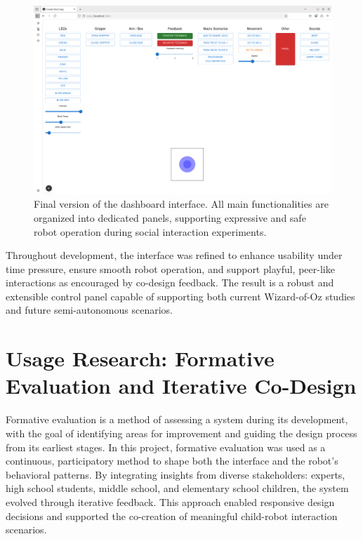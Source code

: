 \documentclass[a4paper]{usiinfbachelorproject}
\begin{document}
\begin{figure}[H]
    \centering
    \includegraphics[width=\linewidth]{figures/dashboard_v3.png}
    \caption{Final version of the dashboard interface. All main functionalities are organized into dedicated panels, supporting expressive and safe robot operation during social interaction experiments.}
    \label{fig:dashboard-v3-desc}
\end{figure}

Throughout development, the interface was refined to enhance usability under time pressure, ensure smooth robot operation, and support playful, peer-like interactions as encouraged by co-design feedback.
The result is a robust and extensible control panel capable of supporting both current Wizard-of-Oz studies and future semi-autonomous scenarios.

\section{\textbf{Usage Research: Formative Evaluation and Iterative Co-Design}}\label{sec:evaluation}
Formative evaluation is a method of assessing a system during its development, with the goal of identifying areas for improvement and guiding the design process from its earliest stages.
In this project, formative evaluation was used as a continuous, participatory method to shape both the interface and the robot's behavioral patterns.
By integrating insights from diverse stakeholders: experts, high school students, middle school, and elementary school children, the system evolved through iterative feedback.
This approach enabled responsive design decisions and supported the co-creation of meaningful child-robot interaction scenarios.
\end{document}
